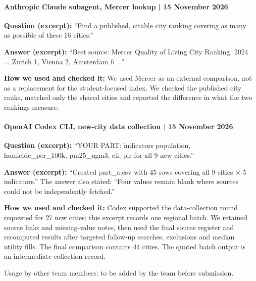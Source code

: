 \documentclass{mcmthesis}
\begin{document}
\paragraph{Anthropic Claude subagent, Mercer lookup | 15 November 2026}
\textbf{Question (excerpt):} ``Find a published, citable city ranking covering as many as possible of these 16 cities.''

\textbf{Answer (excerpt):} ``Best source: Mercer Quality of Living City Ranking, 2024 ... Zurich 1, Vienna 2, Amsterdam 6 ...''

\textbf{How we used and checked it:} We used Mercer as an external comparison, not as a replacement for the student-focused index. We checked the published city ranks, matched only the shared cities and reported the difference in what the two rankings measure.



\paragraph{OpenAI Codex CLI, new-city data collection | 15 November 2026}
\textbf{Question (excerpt):} ``YOUR PART: indicators population, homicide\_per\_100k, pm25\_ugm3, cli, pir for all 9 new cities.''

\textbf{Answer (excerpt):} ``Created part\_a.csv with 45 rows covering all 9 cities $\times$ 5 indicators.'' The answer also stated: ``Four values remain blank where sources could not be independently fetched.''

\textbf{How we used and checked it:} Codex supported the data-collection round requested for 27 new cities; this excerpt records one regional batch. We retained source links and missing-value notes, then used the final source register and recomputed results after targeted follow-up searches, exclusions and median utility fills. The final comparison contains 44 cities. The quoted batch output is an intermediate collection record.

Usage by other team members: to be added by the team before submission.
\end{document}
